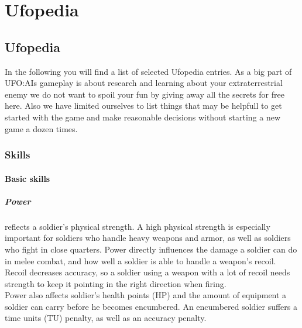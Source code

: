 
%
%


\chapter{Ufopedia}

\section{Ufopedia}
In the following you will find a list of selected Ufopedia entries. As a big part of UFO:AIs gameplay is about research and learning about your extraterrestrial enemy we do not want to spoil your fun by giving away all the secrets for free here. Also we have limited ourselves to list things that may be helpfull to get started with the game and make reasonable decisions without starting a new game a dozen times.

\subsection{Skills}
\subsubsection{Basic skills}
\paragraph*{Power}
 reflects a soldier's physical strength. A high physical strength is especially important for soldiers who handle heavy weapons and armor, as well as soldiers who fight in close quarters. Power directly influences the damage a soldier can do in melee combat, and how well a soldier is able to handle a weapon's recoil. Recoil decreases accuracy, so a soldier using a weapon with a lot of recoil needs strength to keep it pointing in the right direction when firing.\\
Power also affects soldier's health points (HP) and the amount of equipment a soldier can carry before he becomes encumbered. An encumbered soldier suffers a time units (TU) penalty, as well as an accuracy penalty.
